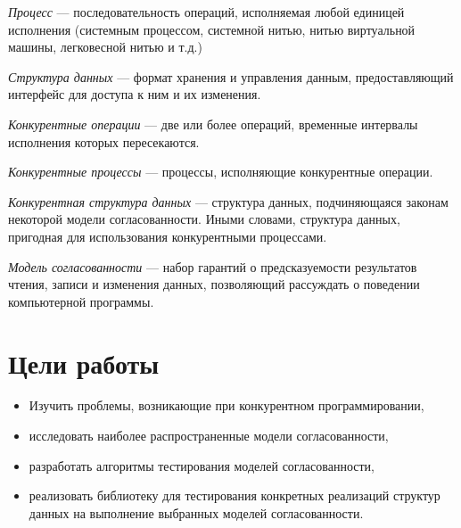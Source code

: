 \documentclass[14pt, openany]{book}
\begin{document}
\emph{Процесс} --- последовательность операций, исполняемая любой единицей исполнения (системным процессом, системной нитью, нитью виртуальной машины, легковесной нитью и т.д.)

\emph{Структура данных} --- формат хранения и управления данным, предоставляющий интерфейс для доступа к ним и их изменения.

\emph{Конкурентные операции} --- две или более операций, временные интервалы исполнения которых пересекаются.

\emph{Конкурентные процессы} --- процессы, исполняющие конкурентные операции.

\emph{Конкурентная структура данных} --- структура данных, подчиняющаяся законам некоторой модели согласованности. Иными словами, структура данных, пригодная для использования конкурентными процессами. 

\emph{Модель согласованности} --- набор гарантий о предсказуемости результатов чтения, записи и изменения данных, позволяющий рассуждать о поведении компьютерной программы.

\section{Цели работы}

\begin{itemize}
  \item Изучить проблемы, возникающие при конкурентном программировании,
  \item исследовать наиболее распространенные модели согласованности,
  \item разработать алгоритмы тестирования моделей согласованности,
  \item реализовать библиотеку для тестирования конкретных реализаций структур данных на выполнение выбранных моделей согласованности.
\end{itemize}
\end{document}
